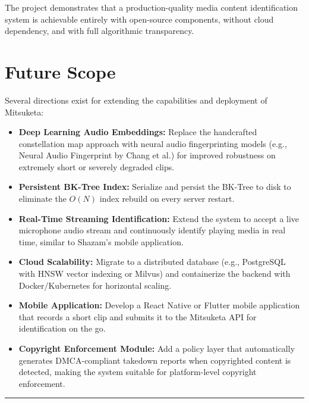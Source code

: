 The project demonstrates that a production-quality media content identification system is achievable entirely with open-source components, without cloud dependency, and with full algorithmic transparency.

\section{Future Scope}
Several directions exist for extending the capabilities and deployment of Mitsuketa:

\begin{itemize}
  \item \textbf{Deep Learning Audio Embeddings:} Replace the handcrafted constellation map approach with neural audio fingerprinting models (e.g., Neural Audio Fingerprint by Chang et al.) for improved robustness on extremely short or severely degraded clips.

  \item \textbf{Persistent BK-Tree Index:} Serialize and persist the BK-Tree to disk to eliminate the $O(N)$ index rebuild on every server restart.

  \item \textbf{Real-Time Streaming Identification:} Extend the system to accept a live microphone audio stream and continuously identify playing media in real time, similar to Shazam's mobile application.

  \item \textbf{Cloud Scalability:} Migrate to a distributed database (e.g., PostgreSQL with HNSW vector indexing or Milvus) and containerize the backend with Docker/Kubernetes for horizontal scaling.

  \item \textbf{Mobile Application:} Develop a React Native or Flutter mobile application that records a short clip and submits it to the Mitsuketa API for identification on the go.

  \item \textbf{Copyright Enforcement Module:} Add a policy layer that automatically generates DMCA-compliant takedown reports when copyrighted content is detected, making the system suitable for platform-level copyright enforcement.
\end{itemize}

\vspace{10mm}
\hrule